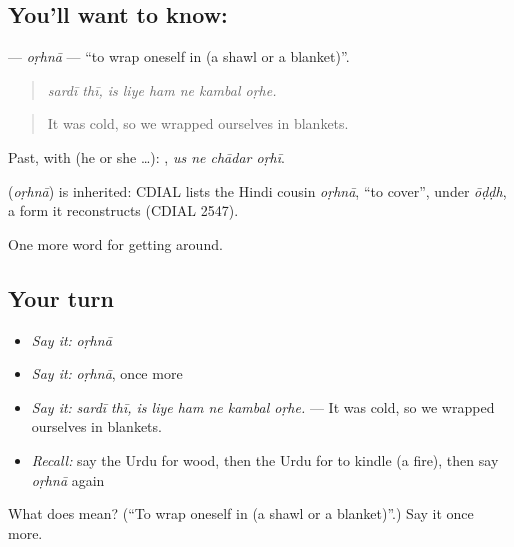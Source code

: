 \subsection*{You'll want to know: }
\textbf{} — \emph{oṛhnā} — \textquotedblleft{}to wrap oneself in (a shawl or a blanket)\textquotedblright{}.

\begin{quote}
       
\end{quote}

\begin{quote}
\emph{sardī thī, is liye ham ne kambal oṛhe.}
\end{quote}

\begin{quote}
It was cold, so we wrapped ourselves in blankets.
\end{quote}

Past, with  (he or she …):    , \emph{us ne chādar oṛhī}.

\begin{cousinweb}
\textbf{} (\emph{oṛhnā}) is inherited: CDIAL lists the Hindi cousin \emph{oṛhnā}, \textquotedblleft{}to cover\textquotedblright{}, under \emph{ōḍḍh}, a form it reconstructs (CDIAL 2547).
\end{cousinweb}

\begin{grammarlens}[title={What you've built}]
One more word for getting around.
\end{grammarlens}

\subsection*{Your turn}
\begin{itemize}
\raggedright
  \item \emph{Say it:} \emph{oṛhnā}
  \item \emph{Say it:} \emph{oṛhnā}, once more
  \item \emph{Say it:} \emph{sardī thī, is liye ham ne kambal oṛhe.} — It was cold, so we wrapped ourselves in blankets.
  \item \emph{Recall:} say the Urdu for wood, then the Urdu for to kindle (a fire), then say \emph{oṛhnā} again
\end{itemize}

\begin{tcolorbox}[breakable,colback=teal!4,colframe=teal!35!black,title={Before you move on}]
What does  mean? (\textquotedblleft{}To wrap oneself in (a shawl or a blanket)\textquotedblright{}.) Say it once more.
\end{tcolorbox}
